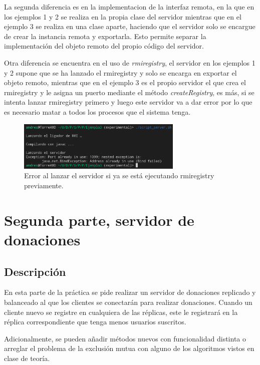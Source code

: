 \documentclass{article}
\begin{document}
La segunda diferencia es en la implementacion de la interfaz remota, en la que en los ejemplos 1 y 2 se realiza en la propia clase del servidor mientras que en el ejemplo 3 se realiza en una clase aparte, haciendo que el servidor solo se encargue de crear la instancia remota y exportarla. Esto permite separar la implementación del objeto remoto del propio código del servidor.

Otra diferencia se encuentra en el uso de \textit{rmiregistry}, el servidor en los ejemplos 1 y 2 supone que se ha lanzado el rmiregistry y solo se encarga en exportar el objeto remoto, mientras que en el ejemplo 3 es el propio servidor el que crea el rmiregistry y le asigna un puerto mediante el método \textit{createRegistry}, es más, si se intenta lanzar rmiregistry primero y luego este servidor va a dar error por lo que es necesario matar a todos los procesos que el sistema tenga.

\begin{figure}[H]
    \centering
    \includegraphics[width=0.7\textwidth]{imagenes/E3Error.png}
    \caption{Error al lanzar el servidor si ya se está ejecutando rmiregistry previamente.}
\end{figure}


\section{Segunda parte, servidor de donaciones}
\subsection{Descripción}
En esta parte de la práctica se pide realizar un servidor de donaciones replicado y balanceado al que los clientes se conectarán para realizar donaciones. Cuando un cliente nuevo se registre en cualquiera de las réplicas, este le registrará en la réplica correspondiente que tenga menos usuarios suscritos.

Adicionalmente, se pueden añadir métodos nuevos con funcionalidad distinta o arreglar el problema de la exclusión mutua con alguno de los algoritmos vistos en clase de teoría.
\end{document}
